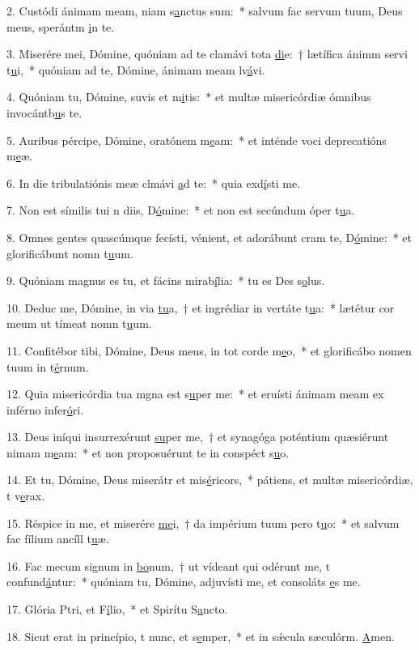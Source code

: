 2. Custódi ánimam meam, niam s\uline{a}nctus sum:~* salvum fac servum tuum, Deus meus, sperántm \uline{i}n te.\par 
3. Miserére mei, Dómine, quóniam ad te clamávi tota \uline{di}e:~† lætífica ánimm servi t\uline{u}i,~* quóniam ad te, Dómine, ánimam meam lv\uline{á}vi.\par 
4. Quóniam tu, Dómine, suvis et m\uline{i}tis:~* et multæ misericórdiæ ómnibus invocántb\uline{u}s te.\par 
5. Auribus pércipe, Dómine, oratónem m\uline{e}am:~* et inténde voci deprecatións m\uline{e}æ.\par 
6. In die tribulatiónis meæ clmávi \uline{a}d te:~* quia exd\uline{í}sti me.\par 
7. Non est símilis tui n diis, D\uline{ó}mine:~* et non est secúndum óper t\uline{u}a.\par 
8. Omnes gentes quascúmque fecísti, vénient, et adorábunt cram te, D\uline{ó}mine:~* et glorificábunt nomn t\uline{u}um.\par 
9. Quóniam magnus es tu, et fácins mirab\uline{í}lia:~* tu es Des s\uline{o}lus.\par 
10. Deduc me, Dómine, in via \uline{tu}a,~† et ingrédiar in vertáte t\uline{u}a:~* lætétur cor meum ut tímeat nomn t\uline{u}um.\par 
11. Confitébor tibi, Dómine, Deus meus, in tot corde m\uline{e}o,~* et glorificábo nomen tuum in t\uline{é}rnum.\par 
12. Quia misericórdia tua mgna est s\uline{u}per me:~* et eruísti ánimam meam ex inférno infer\uline{ó}ri.\par 
13. Deus iníqui insurrexérunt \uline{su}per me,~† et synagóga poténtium quæsiérunt nimam m\uline{e}am:~* et non proposuérunt te in conspéct s\uline{u}o.\par 
14. Et tu, Dómine, Deus miserátr et mis\uline{é}ricors,~* pátiens, et multæ misericórdiæ, t v\uline{e}rax.\par 
15. Réspice in me, et miserére \uline{me}i,~† da impérium tuum pero t\uline{u}o:~* et salvum fac fílium ancíll t\uline{u}æ.\par 
16. Fac mecum signum in \uline{bo}num,~† ut vídeant qui odérunt me, t confund\uline{á}ntur:~* quóniam tu, Dómine, adjuvísti me, et consoláts \uline{e}s me.\par 
17. Glória Ptri, et F\uline{í}lio,~* et Spirítu S\uline{a}ncto.\par 
18. Sicut erat in princípio, t nunc, et s\uline{e}mper,~* et in sǽcula sæculórm. \uline{A}men.\par 
